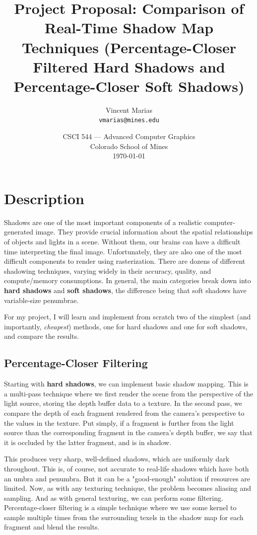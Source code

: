 \documentclass{article}
\title{Project Proposal: Comparison of Real-Time Shadow Map Techniques (Percentage-Closer Filtered Hard Shadows and Percentage-Closer Soft Shadows)} %
\author{Vincent Marias\\ \texttt{vmarias@mines.edu}} %
\date{CSCI 544 --- Advanced Computer Graphics\\Colorado School of Mines\\\today} %
\begin{document}
\maketitle %


\section{Description} %

Shadows are one of the most important components of a realistic computer-generated image. They provide crucial information about the spatial relationships of objects and lights in a scene. Without them, our brains can have a difficult time interpreting the final image. Unfortunately, they are also one of the most difficult components to render using rasterization. There are dozens of different shadowing techniques, varying widely in their accuracy, quality, and compute/memory consumptions. In general, the main categories break down into \textbf{hard shadows} and \textbf{soft shadows}, the difference being that soft shadows have variable-size penumbrae.

For my project, I will learn and implement from scratch two of the simplest (and importantly, \emph{cheapest}) methods, one for hard shadows and one for soft shadows, and compare the results.

\subsection{Percentage-Closer Filtering}

Starting with \textbf{hard shadows}, we can implement basic shadow mapping. This is a multi-pass technique where we first render the scene from the perspective of the light source, storing the depth buffer data to a texture. In the second pass, we compare the depth of each fragment rendered from the camera's perspective to the values in the texture. Put simply, if a fragment is further from the light source than the corresponding fragment in the camera's depth buffer, we say that it is occluded by the latter fragment, and is in shadow.

This produces very sharp, well-defined shadows, which are uniformly dark throughout. This is, of course, not accurate to real-life shadows which have both an umbra and penumbra. But it can be a "good-enough" solution if resources are limited. Now, as with any texturing technique, the problem becomes aliasing and sampling. And as with general texturing, we can perform some filtering. Percentage-closer filtering is a simple technique where we use some kernel to sample multiple times from the surrounding texels in the shadow map for each fragment and blend the results.
\end{document}

